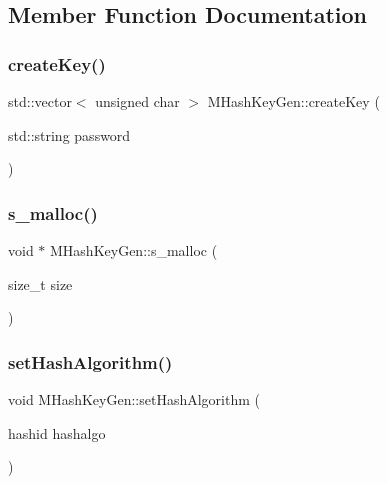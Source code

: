 \subsection{Member Function Documentation}
\mbox{\label{classMHashKeyGen_a94021d906060002d1d4c2ff7c141389d}} 
\subsubsection{create\+Key()}
{\footnotesize\ttfamily std\+::vector$<$ unsigned char $>$ M\+Hash\+Key\+Gen\+::create\+Key (\begin{DoxyParamCaption}\item[{std\+::string}]{password }\end{DoxyParamCaption})}

\mbox{\label{classMHashKeyGen_aa64a9326a3c3fb931d535afd95afb738}} 
\subsubsection{s\+\_\+malloc()}
{\footnotesize\ttfamily void $\ast$ M\+Hash\+Key\+Gen\+::s\+\_\+malloc (\begin{DoxyParamCaption}\item[{size\+\_\+t}]{size }\end{DoxyParamCaption})\hspace{0.3cm}{\ttfamily [private]}}

\mbox{\label{classMHashKeyGen_a8c274ba1b37bb5075e9f122ce97d6fa9}} 
\subsubsection{set\+Hash\+Algorithm()}
{\footnotesize\ttfamily void M\+Hash\+Key\+Gen\+::set\+Hash\+Algorithm (\begin{DoxyParamCaption}\item[{hashid}]{hashalgo }\end{DoxyParamCaption})}

\mbox{\label{classMHashKeyGen_a24fb66cb5aa7c5120ca8b65667435c5b}} 
